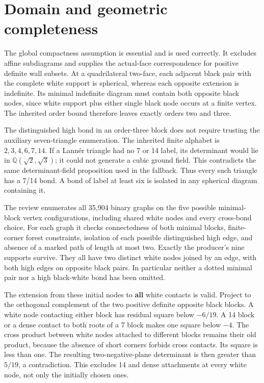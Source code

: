 \documentclass[
  10pt,
]{report}
\begin{document}
\section{Domain and geometric
completeness}\label{domain-and-geometric-completeness}

The global compactness assumption is essential and is used correctly. It
excludes affine subdiagrams and supplies the actual-face correspondence
for positive definite wall subsets. At a quadrilateral two-face, each
adjacent black pair with the complete white support is spherical,
whereas each opposite extension is indefinite. Its minimal indefinite
diagram must contain both opposite black nodes, since white support plus
either single black node occurs at a finite vertex. The inherited order
bound therefore leaves exactly orders two and three.

The distinguished high bond in an order-three block does not require
trusting the auxiliary seven-triangle enumeration. The inherited finite
alphabet is \(2,3,4,6,7,14\). If a Lannér triangle had no 7 or 14 label,
its determinant would lie in \(\mathbb Q(\sqrt2,\sqrt3)\); it could not
generate a cubic ground field. This contradicts the same
determinant-field proposition used in the fallback. Thus every such
triangle has a 7/14 bond. A bond of label at least six is isolated in
any spherical diagram containing it.

The review enumerates all 35,904 binary graphs on the five possible
minimal-block vertex configurations, including shared white nodes and
every cross-bond choice. For each graph it checks connectedness of both
minimal blocks, finite-corner forest constraints, isolation of each
possible distinguished high edge, and absence of a marked path of length
at most two. Exactly the producer's nine supports survive. They all have
two distinct white nodes joined by an edge, with both high edges on
opposite black pairs. In particular neither a dotted minimal pair nor a
high black-white bond has been omitted.

The extension from these initial nodes to \textbf{all} white contacts is
valid. Project to the orthogonal complement of the two positive definite
opposite black blocks. A white node contacting either block has residual
square below \(-6/19\). A 14 block or a dense contact to both roots of a
7 block makes one square below \(-4\). The cross product between white
nodes attached to different blocks remains their old product, because
the absence of short corners forbids cross contacts. Its square is less
than one. The resulting two-negative-plane determinant is then greater
than \(5/19\), a contradiction. This excludes 14 and dense attachments
at every white node, not only the initially chosen ones.
\end{document}
